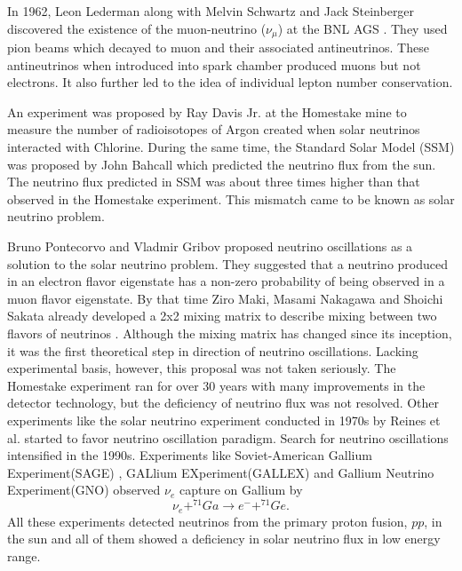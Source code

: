 \documentclass[11pt]{article}
\numberwithin{equation}{section}
\begin{document}
In 1962, Leon Lederman along with Melvin Schwartz and Jack Steinberger discovered the existence of the muon-neutrino ($ \nu_{\mu}$) at the BNL AGS \cite{danby1962observation}. They used pion beams which decayed to muon and  their associated antineutrinos. These antineutrinos when introduced into spark chamber produced muons but not electrons. It also further led to the idea of individual lepton number conservation. 


An experiment was proposed by Ray Davis Jr. at the Homestake mine \cite{davis1968search} to measure the number of radioisotopes of Argon created when solar neutrinos interacted with Chlorine. During the same time, the Standard Solar Model (SSM) was proposed by John Bahcall \cite{bahcall1964solar} which predicted the neutrino flux from the sun. The neutrino flux predicted in SSM was about three times higher than that observed in the Homestake experiment. This mismatch came to be known as solar neutrino problem.

Bruno Pontecorvo and Vladmir Gribov proposed \cite{gribov1969neutrino} neutrino oscillations as a solution to the solar neutrino problem. They suggested that a neutrino produced in an electron flavor eigenstate has a non-zero probability of being observed in a muon flavor eigenstate. By that time Ziro Maki, Masami Nakagawa and Shoichi Sakata already developed a 2x2 mixing matrix to describe mixing between two flavors of neutrinos \cite{maki1962remarks}. Although the mixing matrix has changed since its inception, it was the first theoretical step in direction of neutrino oscillations. Lacking experimental basis, however, this proposal was not taken seriously. The Homestake experiment ran for over 30 years with many improvements in the detector technology, but the deficiency of neutrino flux was not resolved. Other experiments like the solar neutrino experiment conducted in 1970s by Reines et al.\cite{reines1980evidence} started to favor neutrino oscillation paradigm. Search for neutrino oscillations intensified in the 1990s. Experiments like Soviet-American Gallium Experiment(SAGE) \cite{abdurashitov1994results} , GALlium EXperiment(GALLEX) \cite{hampel1999gallex} and Gallium Neutrino Experiment(GNO) \cite{bellotti2001first} observed $\nu_{e}$ capture on Gallium by
\begin{equation}
\nu_{e} + ^{71}Ga \rightarrow e^{-}+^{71}Ge.
\end{equation}
All these experiments detected neutrinos from the primary proton fusion, $pp$, in the sun and all of them showed a deficiency in solar neutrino flux in low energy range.
\end{document}
